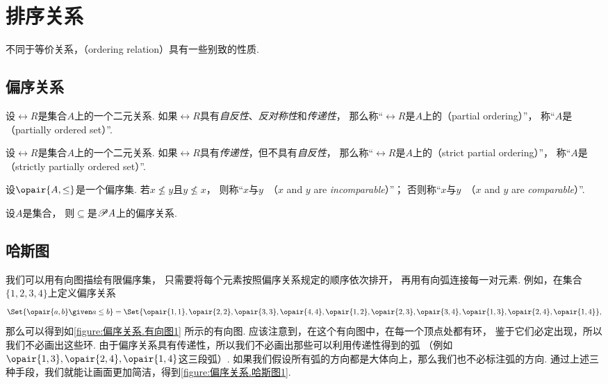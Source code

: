 \section{排序关系}
不同于等价关系，（ordering relation）具有一些别致的性质.

\subsection{偏序关系}
\begin{definition}
设\(\rel{R}\)是集合\(A\)上的一个二元关系.
如果\(\rel{R}\)具有\emph{自反性}、\emph{反对称性}和\emph{传递性}，
那么称“\(\rel{R}\)是\(A\)上的（partial ordering）”，
称“\(A\)是（partially ordered set）”.
\end{definition}

\begin{definition}
设\(\rel{R}\)是集合\(A\)上的一个二元关系.
如果\(\rel{R}\)具有\emph{传递性}，但不具有\emph{自反性}，
那么称“\(\rel{R}\)是\(A\)上的（strict partial ordering）”，
称“\(A\)是（strictly partially ordered set）”.
\end{definition}

\begin{definition}
设\(\opair{A,\leq}\)是一个偏序集.
若\(x \nleq y\)且\(y \nleq x\)，
则称“\(x\)与\(y\)~（\(x\) and \(y\) are \emph{incomparable}）”；
否则称“\(x\)与\(y\)~（\(x\) and \(y\) are \emph{comparable}）”.
\end{definition}

\begin{example}
设\(A\)是集合，
则\(\subseteq\)是\(\mathscr{P} A\)上的偏序关系.
\end{example}

\subsection{哈斯图}
我们可以用有向图描绘有限偏序集，
只需要将每个元素按照偏序关系规定的顺序依次排开，
再用有向弧连接每一对元素.
例如，在集合\(\{1,2,3,4\}\)上定义偏序关系\[
	\Set{\opair{a,b} \given a \leq b}
	= \Set{
		\opair{1,1},
		\opair{2,2},
		\opair{3,3},
		\opair{4,4},
		\opair{1,2},
		\opair{2,3},
		\opair{3,4},
		\opair{1,3},
		\opair{2,4},
		\opair{1,4}
	},
\]
那么可以得到如\cref{figure:偏序关系.有向图1} 所示的有向图.
应该注意到，在这个有向图中，在每一个顶点处都有环，
鉴于它们必定出现，所以我们不必画出这些环.
由于偏序关系具有传递性，所以我们不必画出那些可以利用传递性得到的弧
（例如\(\opair{1,3},
\opair{2,4},
\opair{1,4}\)这三段弧）.
如果我们假设所有弧的方向都是大体向上，那么我们也不必标注弧的方向.
通过上述三种手段，我们就能让画面更加简洁，得到\cref{figure:偏序关系.哈斯图1}.

